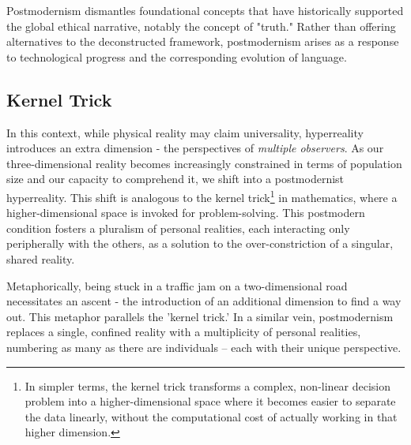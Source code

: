 \documentclass[11pt,a4]{article}
\begin{document}
    Postmodernism dismantles foundational concepts
    that have historically supported
    the global ethical narrative, notably the concept of "truth." Rather than
    offering alternatives to the deconstructed framework, postmodernism arises
    as a response to technological
    progress and the corresponding evolution of language.

    \subsection{Kernel Trick} \label{kerneltrick}
    In this context, while physical reality may claim universality, hyperreality
    introduces an extra dimension - the perspectives of \textit{multiple observers}.
    As our three-dimensional reality becomes increasingly constrained
    in terms of population size and our capacity to comprehend it,
    we shift into a postmodernist hyperreality. This shift is analogous
    to the kernel trick\footnote{In simpler terms, the kernel trick
    transforms a complex, non-linear decision problem into a
    higher-dimensional space where it becomes easier to separate
    the data linearly, without the computational cost of actually
    working in that higher dimension.
    } in mathematics, where a higher-dimensional space is invoked
    for problem-solving.
    This postmodern condition fosters a pluralism of personal realities,
    each interacting only peripherally with the others, as a solution to
    the over-constriction of a singular, shared reality.

    Metaphorically, being stuck in a traffic jam on a two-dimensional
    road necessitates an ascent - the introduction of an additional
    dimension to find a way out. This metaphor parallels the 'kernel trick.'
    In a similar vein, postmodernism replaces a single, confined reality
    with a multiplicity of personal realities, numbering as many as
    there are individuals – each with their unique perspective.
\end{document}
